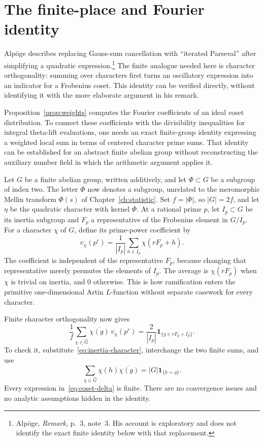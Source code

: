 \documentclass[11pt,openany,oneside]{scrbook}
\theoremstyle{definition}
\theoremstyle{remark}
\begin{document}
\section{The finite-place and Fourier identity}\label{sec:arithmetic-fourier}

Alp\"oge describes replacing Gauss-sum cancellation with ``iterated Parseval'' after simplifying a quadratic expression.\footnote{Alp\"oge, \emph{Remark}, p.~3, note~3. His account is exploratory and does not identify the exact finite identity below with that replacement.} The finite analogue needed here is character orthogonality: summing over characters first turns an oscillatory expression into an indicator for a Frobenius coset. This identity can be verified directly, without identifying it with the more elaborate argument in his remark.

Proposition~\ref{prop:weights} computes the Fourier coefficients of an ideal coset distribution. To connect these coefficients with the divisibility inequalities for integral theta-lift evaluations, one needs an exact finite-group identity expressing a weighted local sum in terms of centered character prime sums. That identity can be established for an abstract finite abelian group without reconstructing the auxiliary number field in which the arithmetic argument applies it.

Let $G$ be a finite abelian group, written additively, and let $\Phi\subset G$ be a subgroup of index two. The letter $\Phi$ now denotes a subgroup, unrelated to the meromorphic Mellin transform $\Phi(s)$ of Chapter~\ref{ch:statistic}.  Set $f=|\Phi|$, so $|G|=2f$, and let $\eta$ be the quadratic character with kernel $\Phi$.  At a rational prime $p$, let $I_p\subset G$ be its inertia subgroup and $F_p$ a representative of the Frobenius element in $G/I_p$.  For a character $\chi$ of $G$, define its prime-power coefficient by
\begin{equation}\label{eq:inertia-character}
v_\chi(p^r)=\frac1{|I_p|}\sum_{h\in I_p}\chi(rF_p+h).
\end{equation}
The coefficient is independent of the representative $F_p$, because changing that representative merely permutes the elements of $I_p$.  The average is $\chi(rF_p)$ when $\chi$ is trivial on inertia, and $0$ otherwise.  This is how ramification enters the primitive one-dimensional Artin $L$-function without separate casework for every character.

Finite character orthogonality now gives
\begin{equation}\label{eq:coset-delta}
\frac1f\sum_{\chi\in\widehat G}\overline{\chi(g)}\,v_\chi(p^r)
=\frac{2}{|I_p|}\mathbf1_{\{g\in rF_p+I_p\}}.
\end{equation}
To check it, substitute~\eqref{eq:inertia-character}, interchange the two finite sums, and use
\[
\sum_{\chi\in\widehat G}\chi(h)\overline{\chi(g)}
=|G|\mathbf1_{\{h=g\}}.
\]
Every expression in~\eqref{eq:coset-delta} is finite.  There are no convergence issues and no analytic assumptions hidden in the identity.
\end{document}
